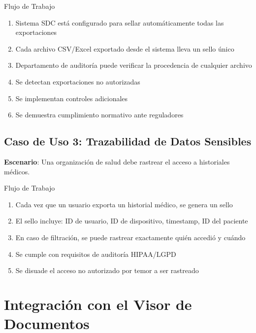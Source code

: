 \begin{caja}{Flujo de Trabajo}
\begin{enumerate}
\item Sistema SDC está configurado para sellar automáticamente todas las exportaciones
\item Cada archivo CSV/Excel exportado desde el sistema lleva un sello único
\item Departamento de auditoría puede verificar la procedencia de cualquier archivo
\item Se detectan exportaciones no autorizadas
\item Se implementan controles adicionales
\item Se demuestra cumplimiento normativo ante reguladores
\end{enumerate}
\end{caja}


\subsection{Caso de Uso 3: Trazabilidad de Datos Sensibles}

\textbf{Escenario}: Una organización de salud debe rastrear el acceso a historiales médicos.

\begin{caja}{Flujo de Trabajo}
\begin{enumerate}
\item Cada vez que un usuario exporta un historial médico, se genera un sello
\item El sello incluye: ID de usuario, ID de dispositivo, timestamp, ID del paciente
\item En caso de filtración, se puede rastrear exactamente quién accedió y cuándo
\item Se cumple con requisitos de auditoría HIPAA/LGPD
\item Se disuade el acceso no autorizado por temor a ser rastreado
\end{enumerate}
\end{caja}


\section{Integración con el Visor de Documentos}
\label{sec:ai-visor}

